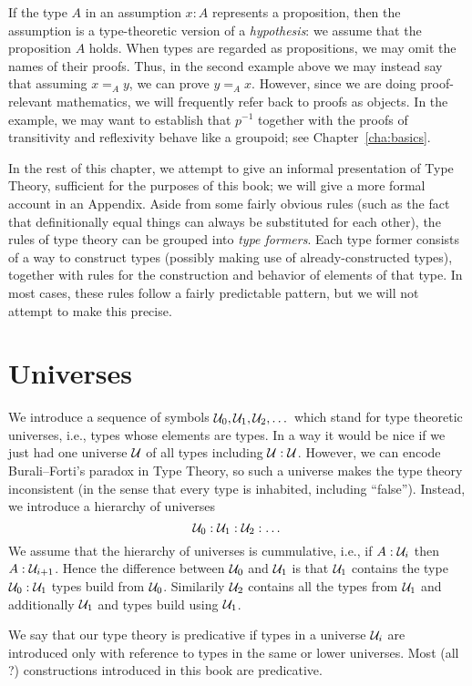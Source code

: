 If the type $A$ in an assumption $x:A$ represents a proposition, then the assumption is a type-theoretic version of a \emph{hypothesis}: we assume that the proposition $A$ holds.
When types are regarded as propositions, we may omit the names of their proofs.
Thus, in the second example above we may instead say that assuming $x =_A y$, we can prove $y =_A x$.
However, since we are doing proof-relevant mathematics, we will frequently refer back to proofs as objects.
In the example, we may want to establish that $p^{-1}$ together with the proofs of transitivity and reflexivity behave like a groupoid; see Chapter~\ref{cha:basics}.

In the rest of this chapter, we attempt to give an informal presentation of Type Theory, sufficient for the purposes of this book; we will give a more formal account in an Appendix.
Aside from some fairly obvious rules (such as the fact that definitionally equal things can always be substituted for each other), the rules of type theory can be grouped into \emph{type formers}.
Each type former consists of a way to construct types (possibly making use of already-constructed types), together with rules for the construction and behavior of elements of that type.
In most cases, these rules follow a fairly predictable pattern, but we will not attempt to make this precise.


\section{Universes}
\label{sec:universes}

We introduce a sequence of symbols $\mathcal{U}_0,\mathcal{U}_1,\mathcal{U}_2, \dots$ which
stand for type theoretic universes, i.e., types whose elements are
types. In a way it would be nice if we just had one universe $\mathcal{U}$ of
all types including $\mathcal{U} : \mathcal{U}$.
However, we can encode Burali--Forti's paradox in Type Theory, so such a universe makes the type theory inconsistent (in the sense that every type is inhabited, including ``false'').
Instead, we introduce a hierarchy of universes
\[ \mathcal{U}_0 : \mathcal{U}_1 : \mathcal{U}_2 : \dots \]
We assume that the hierarchy of universes is cummulative, i.e., if
$A:\mathcal{U}_i$ then $A : \mathcal{U}_{i+1}$. Hence the difference between
$\mathcal{U}_0$ and $\mathcal{U}_1$ is that $\mathcal{U}_1$ contains the type $\mathcal{U}_0:\mathcal{U}_1$
types build from $\mathcal{U}_0$. Similarily $\mathcal{U}_2$ contains all the types
from $\mathcal{U}_1$ and additionally $\mathcal{U}_1$ and types build using $\mathcal{U}_1$. 

We say that our type theory is predicative if types in a universe
$\mathcal{U}_i$ are introduced only with reference to types in the same or
lower universes. Most (all ?) constructions introduced in this book
are predicative. 

